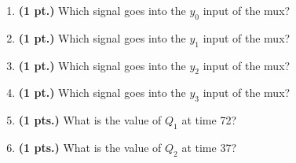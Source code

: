 \documentclass{article}
\begin{document}
\begin{enumerate}
\begin{tabular}{lr}

\begin{tabular}[!t]{l|l|l||l}
clk         & $C_1 C_0$ & D & $Q^+$ \\ \hline \hline
0,1,$\downarrow$ & xx   & x & Q     \\ \hline
$\uparrow$     & 00     & x & Q     \\  \hline
$\uparrow$     & 01     & x & 0     \\  \hline
$\uparrow$     & 10     & x & Q+1 mod 16  \\  \hline
$\uparrow$     & 11     & D & D     \\
\end{tabular}
&
\end{tabular}

\item{\bf (1 pt.)} Which signal goes into the $y_0$ input of the mux?
\item{\bf (1 pt.)} Which signal goes into the $y_1$ input of the mux?
\item{\bf (1 pt.)} Which signal goes into the $y_2$ input of the mux?
\item{\bf (1 pt.)} Which signal goes into the $y_3$ input of the mux?

\pagebreak

\begin{figure}[ht]
\centerline{}
\end{figure}

\item {\bf (1 pts.)} What is the value of $Q_1$ at time 72?

\item {\bf (1 pts.)} What is the value of $Q_2$ at time 37?


\end{enumerate}
\end{document}
